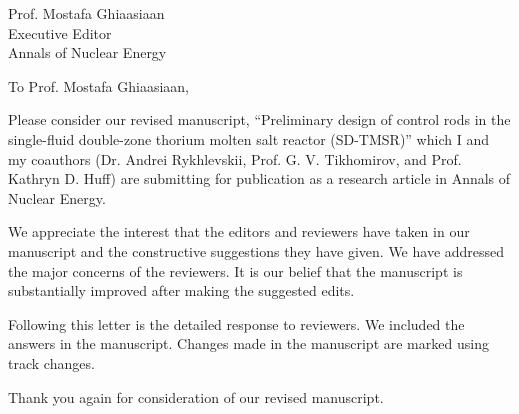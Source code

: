 \documentclass[10.5pt]{letter} %
\newcommand{\RecipientName}{Prof. Mostafa Ghiaasiaan\xspace}
\newcommand{\RecipientAddress}{Executive Editor\\Annals of Nuclear Energy}
\begin{document}
	
	
	
	\begin{letter}{\RecipientName\\
			\RecipientAddress\xspace}
		
		\address{O. Ashraf\\
			oabdelaziz@mephi.ru\\
			osama.ashraf@edu.asu.edu.eg\\
			Institute of Nuc. Physics and Eng.\\
			National Research Nuclear University\\
			Moscow, Russia, 115409}
		
		
		\opening{To \RecipientName,}
		
		Please consider our revised manuscript, ``Preliminary design of control rods in the single-fluid double-zone thorium molten salt reactor (SD-TMSR)'' which I and my coauthors (Dr. Andrei Rykhlevskii, Prof. G. V. Tikhomirov, and Prof. Kathryn D. Huff) are submitting for publication as a research article 
		in Annals of Nuclear Energy. 
		
		We appreciate the interest that the editors and reviewers have taken in our manuscript and the constructive suggestions they have given. We have addressed the major concerns of the reviewers. It is our belief that the manuscript is substantially improved after making the suggested edits.
		
		
		Following this letter is the detailed response to reviewers. We included the 
		answers in the manuscript. Changes made in the manuscript are marked using track changes.
		
	Thank you again for consideration of our revised manuscript.
		
		

\end{letter}
\end{document}
